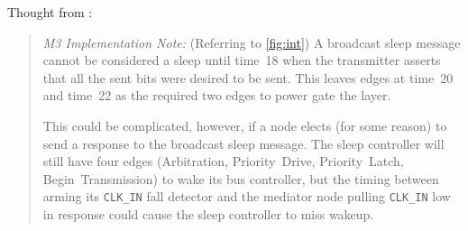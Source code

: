 Thought from :
\begin{quote}
\textit{M3 Implementation Note:} (Referring to
\cref{fig:int}) A broadcast sleep message cannot be considered a
sleep until time~18 when the transmitter asserts that all the sent bits were
desired to be sent. This leaves edges at time~20 and time~22 as the required
two edges to power gate the layer.

This could be complicated, however, if a node elects (for some reason) to send
a response to the broadcast sleep message. The sleep controller will still
have four edges (Arbitration, Priority~Drive, Priority~Latch,
Begin~Transmission) to wake its bus controller, but the timing between arming
its {\tt CLK\_IN} fall detector and the mediator node pulling {\tt CLK\_IN} low
in response could cause the sleep controller to miss wakeup.
\end{quote}
